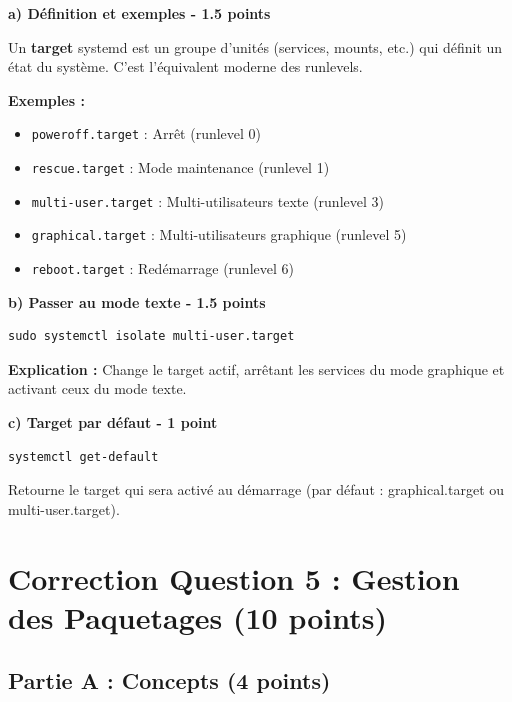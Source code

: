 \documentclass[12pt,a4paper]{article}
\begin{document}
\begin{answerbox}
\textbf{a) Définition et exemples - 1.5 points}

Un \textbf{target} systemd est un groupe d'unités (services, mounts, etc.) qui définit un état du système. C'est l'équivalent moderne des runlevels.

\textbf{Exemples :}
\begin{itemize}
    \item \texttt{poweroff.target} : Arrêt (runlevel 0)
    \item \texttt{rescue.target} : Mode maintenance (runlevel 1)
    \item \texttt{multi-user.target} : Multi-utilisateurs texte (runlevel 3)
    \item \texttt{graphical.target} : Multi-utilisateurs graphique (runlevel 5)
    \item \texttt{reboot.target} : Redémarrage (runlevel 6)
\end{itemize}

\textbf{b) Passer au mode texte - 1.5 points}

\begin{lstlisting}
sudo systemctl isolate multi-user.target
\end{lstlisting}

\textbf{Explication :} Change le target actif, arrêtant les services du mode graphique et activant ceux du mode texte.

\textbf{c) Target par défaut - 1 point}

\begin{lstlisting}
systemctl get-default
\end{lstlisting}

Retourne le target qui sera activé au démarrage (par défaut : graphical.target ou multi-user.target).
\end{answerbox}

\newpage


\section{Correction Question 5 : Gestion des Paquetages (10 points)}

\subsection*{Partie A : Concepts (4 points)}
\end{document}
